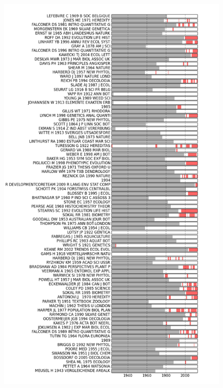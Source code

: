 \documentclass[letterpaper,10pt,english]{sphinxmanual}
\begin{document}
\begin{fulllineitems}
\begin{figure}[htbp]
\includegraphics{burstness.png}
\end{figure}

\end{fulllineitems}

\end{document}
